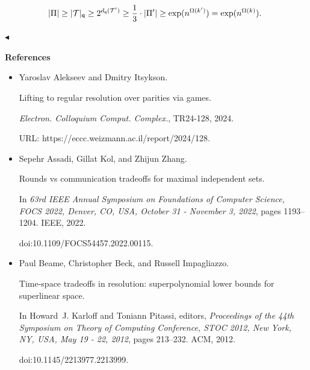 \[\begin{gathered}
|\Pi|\geq|\mathcal{T}|_{\mathsf{q}}\geq 2^{d_{\mathsf{q}}(\mathcal{T}^{\prime}%
)}\geq\frac{1}{3}\cdot|\Pi^{\prime}|\geq\exp(n^{\Omega(k^{\prime})})=\exp(n^{%
\Omega(k)}).\
\end{gathered}\]


$\blacktriangleleft$\par






\par\medskip\noindent\textbf{References}\par



\begin{itemize}


\item[] 
[1]

Yaroslav Alekseev and Dmitry Itsykson.


Lifting to regular resolution over parities via games.


\emph{Electron. Colloquium Comput. Complex.}, TR24-128, 2024.


URL: https://eccc.weizmann.ac.il/report/2024/128.





\item[] 
[2]

Sepehr Assadi, Gillat Kol, and Zhijun Zhang.


Rounds vs communication tradeoffs for maximal independent sets.


In \emph{63rd IEEE Annual Symposium on Foundations of Computer
Science, FOCS 2022, Denver, CO, USA, October 31 - November 3, 2022}, pages
1193–1204. IEEE, 2022.


doi:10.1109/FOCS54457.2022.00115.





\item[] 
[3]

Paul Beame, Christopher Beck, and Russell Impagliazzo.


Time-space tradeoffs in resolution: superpolynomial lower bounds for
superlinear space.


In Howard J. Karloff and Toniann Pitassi, editors, \emph{Proceedings
of the 44th Symposium on Theory of Computing Conference, STOC 2012, New
York, NY, USA, May 19 - 22, 2012}, pages 213–232. ACM, 2012.


doi:10.1145/2213977.2213999.






\end{itemize}
